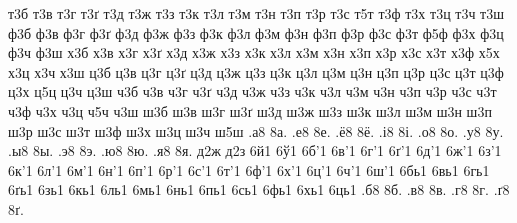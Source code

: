 {т3б
т3в
т3г
т3ґ
т3д
т3ж
т3з
т3к
т3л
т3м
т3н
т3п
т3р
т3с
т5т
т3ф
т3х
т3ц
т3ч
т3ш
ф3б
ф3в
ф3г
ф3ґ
ф3д
ф3ж
ф3з
ф3к
ф3л
ф3м
ф3н
ф3п
ф3р
ф3с
ф3т
ф5ф
ф3х
ф3ц
ф3ч
ф3ш
х3б
х3в
х3г
х3ґ
х3д
х3ж
х3з
х3к
х3л
х3м
х3н
х3п
х3р
х3с
х3т
х3ф
х5х
х3ц
х3ч
х3ш
ц3б
ц3в
ц3г
ц3ґ
ц3д
ц3ж
ц3з
ц3к
ц3л
ц3м
ц3н
ц3п
ц3р
ц3с
ц3т
ц3ф
ц3х
ц5ц
ц3ч
ц3ш
ч3б
ч3в
ч3г
ч3ґ
ч3д
ч3ж
ч3з
ч3к
ч3л
ч3м
ч3н
ч3п
ч3р
ч3с
ч3т
ч3ф
ч3х
ч3ц
ч5ч
ч3ш
ш3б
ш3в
ш3г
ш3ґ
ш3д
ш3ж
ш3з
ш3к
ш3л
ш3м
ш3н
ш3п
ш3р
ш3с
ш3т
ш3ф
ш3х
ш3ц
ш3ч
ш5ш
%
%
%
.а8
8а.
.е8
8е.
.ё8
8ё.
.і8
8і.
.о8
8о.
.у8
8у.
.ы8
8ы.
.э8
8э.
.ю8
8ю.
.я8
8я.
%
%
%
%
%
д2ж
д2з
%
%
%
6й1
6ў1
%
%
%
6б'1
6в'1
6г'1
6ґ'1
6д'1
6ж'1
6з'1
6к'1
6л'1
6м'1
6н'1
6п'1
6р'1
6с'1
6т'1
6ф'1
6х'1
6ц'1
6ч'1
6ш'1
6бь1
6вь1
6гь1
6ґь1
6зь1
6кь1
6ль1
6мь1
6нь1
6пь1
6сь1
6фь1
6хь1
6ць1
%
%
.б8
8б.
.в8
8в.
.г8
8г.
.ґ8
8ґ.
}
